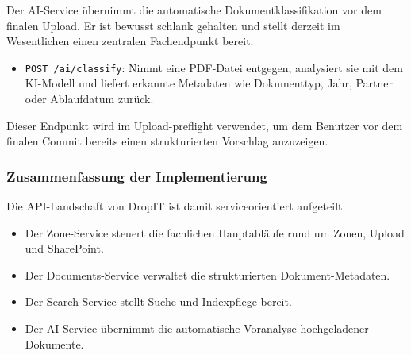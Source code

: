 Der AI-Service übernimmt die automatische Dokumentklassifikation vor dem finalen
Upload. Er ist bewusst schlank gehalten und stellt derzeit im Wesentlichen einen
zentralen Fachendpunkt bereit.

\begin{itemize}
    \item \texttt{POST /ai/classify}: Nimmt eine PDF-Datei entgegen, analysiert sie mit dem KI-Modell und liefert erkannte Metadaten wie Dokumenttyp, Jahr, Partner oder Ablaufdatum zurück.
\end{itemize}

Dieser Endpunkt wird im Upload-\gls{preflight} verwendet, um dem Benutzer vor dem
finalen Commit bereits einen strukturierten Vorschlag anzuzeigen.

\subsubsection{Zusammenfassung der Implementierung}

Die API-Landschaft von DropIT ist damit serviceorientiert aufgeteilt:
\begin{itemize}
    \item Der Zone-Service steuert die fachlichen Hauptabläufe rund um Zonen, Upload und SharePoint.
    \item Der Documents-Service verwaltet die strukturierten Dokument-Metadaten.
    \item Der Search-Service stellt Suche und Indexpflege bereit.
    \item Der AI-Service übernimmt die automatische Voranalyse hochgeladener Dokumente.
\end{itemize}
